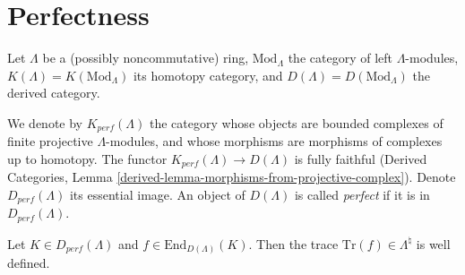 \section{Perfectness}
\label{section-perfect}

\noindent
Let $\Lambda$ be a (possibly noncommutative) ring, $\text{Mod}_{\Lambda}$ the
category of left $\Lambda$-modules, $K(\Lambda) = K(\text{Mod}_\Lambda)$ its
homotopy category, and $D(\Lambda)= D(\text{Mod}_\Lambda)$ the derived
category.

\begin{definition}
\label{definition-perfect}
We denote by $K_{perf}(\Lambda)$ the category whose objects are bounded
complexes of finite projective $\Lambda$-modules, and whose morphisms are
morphisms of complexes up to homotopy. The functor $K_{perf}(\Lambda)\to
D(\Lambda)$ is fully faithful (Derived Categories, Lemma
\ref{derived-lemma-morphisms-from-projective-complex}).
Denote $D_{perf}(\Lambda)$ its essential image.
An object of $D(\Lambda)$ is called {\it perfect} if it is in
$D_{perf}(\Lambda)$.
\end{definition}

\begin{proposition}
\label{proposition-trace-well-defined}
Let $K\in D_{perf}(\Lambda)$ and $f\in \text{End}_{D(\Lambda)}(K)$. Then the
trace $\text{Tr}(f)\in \Lambda^\natural$ is well defined.
\end{proposition}

